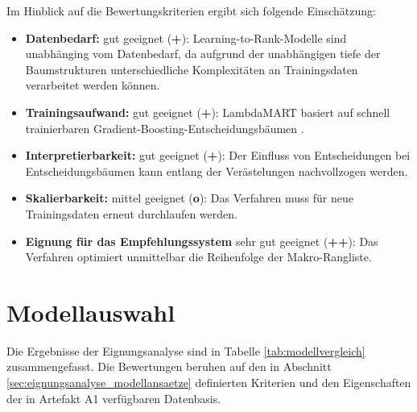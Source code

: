 Im Hinblick auf die Bewertungskriterien ergibt sich folgende Einschätzung: 

\begin{itemize} 
    \item \textbf{Datenbedarf:} gut geeignet (\textbf{+}): Learning-to-Rank-Modelle sind unabhänging vom Datenbedarf, da aufgrund der unabhängigen tiefe der Baumstrukturen unterschiedliche Komplexitäten an Trainingsdaten verarbeitet werden können.
    \item \textbf{Trainingsaufwand:} gut geeignet (\textbf{+}): LambdaMART basiert auf schnell trainierbaren Gradient-Boosting-Entscheidungsbäumen \parencite{burges2010lambdamart,ke2017lightgbm}. 
    \item \textbf{Interpretierbarkeit:} gut geeignet (\textbf{+}): Der Einfluss von Entscheidungen bei Entscheidungsbäumen kann entlang der Verästelungen nachvollzogen werden. 
    \item \textbf{Skalierbarkeit:} mittel geeignet (\textbf{o}): Das Verfahren muss für neue Trainingsdaten erneut durchlaufen werden. 
    \item \textbf{Eignung für das Empfehlungssystem} sehr gut geeignet (\textbf{++}): Das Verfahren optimiert unmittelbar die Reihenfolge der Makro-Rangliste. 
\end{itemize}


\section{Modellauswahl} 
\label{sec:modellauswahl} 

Die Ergebnisse der Eignungsanalyse sind in Tabelle 
\ref{tab:modellvergleich} zusammengefasst. Die Bewertungen beruhen auf den in Abschnitt \ref{sec:eignungsanalyse_modellansaetze} definierten Kriterien und den Eigenschaften der in Artefakt A1 verfügbaren Datenbasis. 

